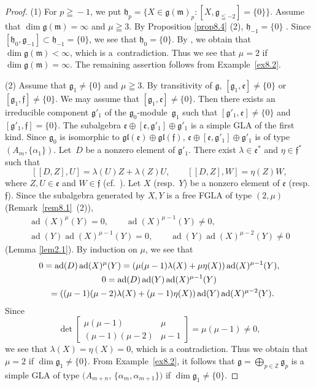 \documentclass[pdftex]{sigma}
\numberwithin{equation}{section}
\numberwithin{theorem}{section}
\numberwithin{proposition}{section}
\numberwithin{lemma}{section}
\numberwithin{corollary}{section}
\numberwithin{definition}{section}
\numberwithin{example}{section}
\numberwithin{remark}{section}
\numberwithin{note}{section}
\newcommand{\ad}{\operatorname{ad}}
\newcommand{\gla}[1]{\mathfrak#1=\bigoplus\limits_{p\in\mathbb Z}\mathfrak#1_p} \renewcommand{\labelenumi}{{\rm (\arabic{enumi})}}
\begin{document}
\begin{proof}
(1) For $p\!\geqq\!{-}1$, we put
$\mathfrak h_p
=\{X\in\mathfrak g(\mathfrak m)_p:[X,\mathfrak g_{\leqq -2}]=\{0\}\}$.
Assume that \mbox{$\dim \mathfrak g(\mathfrak m)=\infty$} and $\mu\geqq3$.
By Proposition \ref{prop8.4} (2),
$\mathfrak h_{-1}=\{0\}$ .
Since $[\mathfrak h_0,\mathfrak g_{-1}]\subset \mathfrak h_{-1}=\{0\}$,
we see that $\mathfrak h_0=\{0\}$.
By \cite[Corollary 1 to Theorem 11.1]{tan70:1}, we obtain that
$\dim\mathfrak g(\mathfrak m)<\infty$,
which is a~contradiction. Thus we see that $\mu=2$ if $\dim \mathfrak g(\mathfrak m)=\infty$. The remaining assertion follows from Example~\ref{ex8.2}.

(2)
Assume that $\mathfrak g_1\ne\{0\}$ and $\mu\geqq3$.
By transitivity of $\mathfrak g$,
$[\mathfrak g_1,\mathfrak e]\ne\{0\}$ or $[\mathfrak g_1,\mathfrak f]\ne\{0\}$.
We may assume that $[\mathfrak g_1,\mathfrak e]\ne\{0\}$.
Then there exists an irreducible component $\mathfrak g'_1$ of
the $\mathfrak g_0$-module~$\mathfrak g_1$
such that $[\mathfrak g'_1,\mathfrak e]\ne\{0\}$ and
$[\mathfrak g'_1,\mathfrak f]=\{0\}$.
The subalgebra $\mathfrak e\oplus[\mathfrak e,\mathfrak g'_1]\oplus
\mathfrak g'_1$ is a simple GLA of the f\/irst kind.
Since $\mathfrak g_0$ is isomorphic to $\mathfrak{gl}(\mathfrak e)\oplus
\mathfrak{gl}(\mathfrak f)$,
$\mathfrak e\oplus[\mathfrak e,\mathfrak g'_1]\oplus \mathfrak g'_1$ is of type $(A_m,\{\alpha_1\})$.
Let~$D$ be a nonzero element of $\mathfrak g'_1$.
There exist $\lambda\in \mathfrak e^*$ and $\eta\in\mathfrak f^*$ such that
\[
[[D,Z],U]=\lambda(U)Z+\lambda(Z)U, \qquad [[D,Z],W]=\eta(Z)W,
\]
where $Z,U\in \mathfrak e$ and $W\in \mathfrak f$
(cf.~\cite[p.~4]{tan57:1}).
Let $X$ (resp.~$Y$) be a nonzero element of $\mathfrak e$
(resp. $\mathfrak f$).
Since the subalgebra generated by $X,Y$ is a free FGLA of type $(2,\mu)$
(Remark~\ref{rem8.1}~(2)),
\begin{gather*}
\ad(X)^\mu(Y)=0, \qquad \ad(X)^{\mu-1}(Y)\ne 0, \\
\ad(Y)\ad(X)^{\mu-1}(Y)=0, \qquad \ad(Y)\ad(X)^{\mu-2}(Y)\ne 0
\end{gather*}
(Lemma \ref{lem2.1}).
By induction on $\mu$, we see that
\begin{gather*}
0  = \ad(D)\ad(X)^\mu(Y)=(\mu(\mu-1)\lambda(X)+\mu\eta(X))\ad(X)^{\mu-1}(Y),
\\
0  = \ad(D)\ad(Y)\ad(X)^{\mu-1}(Y)\\
\hphantom{0}{} =((\mu-1)(\mu-2)\lambda(X)
+(\mu-1)\eta(X))\ad(Y)\ad(X)^{\mu-2}(Y).
\end{gather*}
Since
\[
\det\begin{bmatrix}
\mu(\mu-1) & \mu \\
(\mu-1)(\mu-2) & \mu-1
\end{bmatrix}=
\mu(\mu-1)\ne0,
\]
we see that $\lambda(X)=\eta(X)=0$, which is a contradiction.
Thus we obtain that $\mu=2$ if \mbox{$\dim \mathfrak g_1\ne\{0\}$}.
From Example~\ref{ex8.2}, it follows that
$\gla g$ is a simple GLA of type $(A_{m+n}$, $\{\alpha_m,\alpha_{m+1}\})$
if $\dim \mathfrak g_1\ne\{0\}$.
\end{proof}
\end{document}
